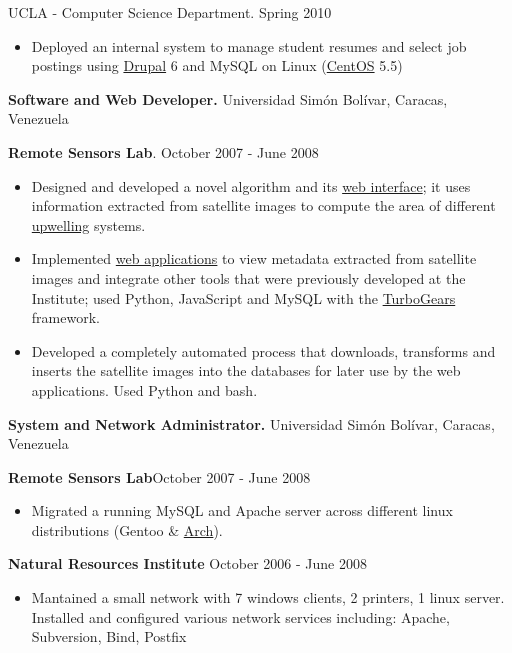 \documentclass[10pt]{article}
\newcommand{\vitem}{\vspace*{-.4pc}\item}
\begin{document}
 UCLA - Computer Science
Department. \hfill Spring 2010
\begin{itemize}
  \vitem Deployed an internal system to manage student resumes and select job postings using \href{http://drupal.org/}{Drupal} 6 and MySQL on Linux (\href{http://www.centos.org/}{CentOS} 5.5) 
\end{itemize}


\flushleft\textbf{Software and Web Developer.} Universidad Simón Bolívar, Caracas, Venezuela

\textbf{Remote Sensors Lab}. \hfill October 2007 - June 2008
\begin{itemize}
  \vitem Designed and developed a novel algorithm and its
  \href{http://ood.cbm.usb.ve/surgencia/sst_modis/mostrar_imagen?img=66}{web
    interface}; it uses information extracted from satellite images to
  compute the area of different
  \href{http://en.wikipedia.org/wiki/Upwelling}{upwelling} systems.

  \vitem Implemented
  \href{http://ood.intecmar.usb.ve/surgencia/sst_modis/}{web
    applications} to view metadata extracted from satellite images and
  integrate other tools that were previously developed at the
  Institute; used Python, JavaScript and MySQL with the
  \href{http://turbogears.org/}{TurboGears} framework.

\vitem Developed a completely automated process that
  downloads, transforms and inserts the satellite images into the
  databases for later use by the web applications. Used Python and bash.
\end{itemize}

\textbf{System and Network Administrator.} Universidad Simón Bolívar, Caracas, Venezuela

\textbf{Remote Sensors Lab}\hfill October 2007 - June 2008
\begin{itemize}
\vitem Migrated a running MySQL and Apache server across different
  linux distributions (Gentoo \& \href{http://www.archlinux.org/}{Arch}).
\end{itemize}

\noindent\textbf{Natural Resources Institute} \hfill October 2006 - June 2008
\begin{itemize}
\vitem Mantained a small network with 7 windows clients, 2 printers, 1
  linux server. Installed and configured various network services including:
  Apache, Subversion, Bind, Postfix
\end{itemize}
\end{document}

